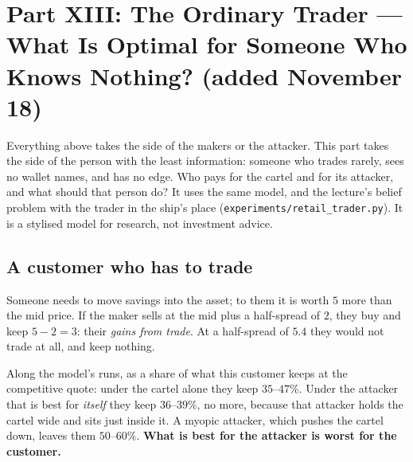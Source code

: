 \documentclass[11pt]{article}
\begin{document}
\section{Part XIII: The Ordinary Trader --- What Is Optimal for Someone Who Knows Nothing? (added November 18)}\label{sec:retail}
Everything above takes the side of the makers or the attacker. This part takes the side of the person
with the least information: someone who trades rarely, sees no wallet names, and has no edge. Who pays
for the cartel and for its attacker, and what should that person do? It uses the same model, and the
lecture's belief problem with the trader in the ship's place (\texttt{experiments/retail\_trader.py}).
It is a stylised model for research, not investment advice.

\subsection{A customer who has to trade}
\begin{example}
Someone needs to move savings into the asset; to them it is worth $5$ more than the mid price. If the
maker sells at the mid plus a half-spread of $2$, they buy and keep $5-2=3$: their \emph{gains from
trade}. At a half-spread of $5.4$ they would not trade at all, and keep nothing.
\end{example}
Along the model's runs, as a share of what this customer keeps at the competitive quote: under the cartel
alone they keep $35$--$47\%$. Under the attacker that is best for \emph{itself} they keep $36$--$39\%$, no
more, because that attacker holds the cartel wide and sits just inside it. A myopic attacker, which pushes
the cartel down, leaves them $50$--$60\%$. \textbf{What is best for the attacker is worst for the customer.}
\end{document}
